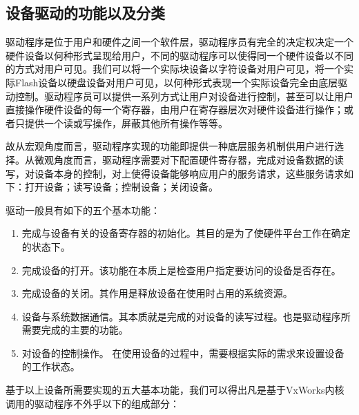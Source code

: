 \subsection{设备驱动的功能以及分类}\label{sec:设备分类}
	
	驱动程序是位于用户和硬件之间一个软件层，驱动程序员有完全的决定权决定一个硬件设备以何种形式呈现给用户，不同的驱动程序可以使得同一个硬件设备以不同的方式对用户可见。我们可以将一个实际块设备以字符设备对用户可见，将一个实际Flash设备以硬盘设备对用户可见，以何种形式表现一个实际设备完全由底层驱动控制。驱动程序员可以提供一系列方式让用户对设备进行控制，甚至可以让用户直接操作硬件设备的每一个寄存器，由用户在寄存器层次对硬件设备进行操作；或者只提供一个读或写操作，屏蔽其他所有操作等等。
	
	故从宏观角度而言，驱动程序实现的功能即提供一种底层服务机制供用户进行选择。从微观角度而言，驱动程序需要对下配置硬件寄存器，完成对设备数据的读写，对设备本身的控制，对上使得设备能够响应用户的服务请求，这些服务请求如下：打开设备；读写设备；控制设备；关闭设备。

驱动一般具有如下的五个基本功能：
	\begin{enumerate}
	\item 完成与设备有关的设备寄存器的初始化。其目的是为了使硬件平台工作在确定的状态下。
	
	\item 完成设备的打开。该功能在本质上是检查用户指定要访问的设备是否存在。
	
	\item 完成设备的关闭。其作用是释放设备在使用时占用的系统资源。
	
	\item 设备与系统数据通信。其本质就是完成的对设备的读写过程。也是驱动程序所需要完成的主要的功能。
	
	\item 对设备的控制操作。 在使用设备的过程中，需要根据实际的需求来设置设备的工作状态。
	\end{enumerate}	
	
基于以上设备所需要实现的五大基本功能，我们可以得出凡是基于VxWorks内核调用的驱动程序不外乎以下的组成部分：

